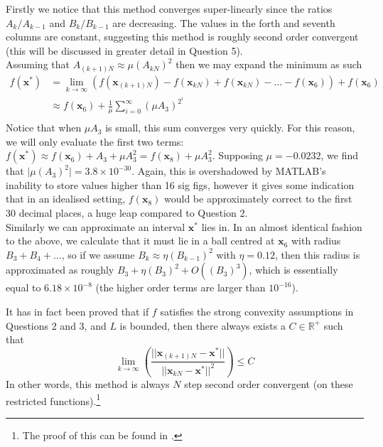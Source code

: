 \documentclass[10pt,a4paper,notitlepage]{article}
\newcommand{\abs}[1]{\lvert#1\rvert}
\newcommand{\R}{\mathbb{R}}
\newcommand{\x}{\mathbf{x}}
\begin{document}
Firstly we notice that this method converges super-linearly since the ratios $A_{k}/A_{k-1}$ and $B_{k}/B_{k-1}$ are decreasing. The values in the forth and seventh columns are constant, suggesting this method is roughly second order convergent (this will be discussed in greater detail in Question 5).\\

Assuming that $A_{(k+1)N}\approx \mu (A_{kN})^{2}$ then we may expand the minimum as such
\begin{equation}
\begin{aligned}
f(\x^{*}) &= \lim_{k\rightarrow \infty}\left( f(\x_{(k+1)N})-f(\x_{kN})+f(\x_{kN})-\hdots -f(\x_{6})\right)+f(\x_{6})\\
&\approx f(\x_{6})+ \frac{1}{\mu}\sum_{i=0}^{\infty}(\mu A_{3})^{2^{i}}\\
\end{aligned}
\end{equation}
Notice that when $\mu A_{3}$ is small, this sum converges very quickly. For this reason, we will only evaluate the first two terms:
$f(\x^{*})\approx f(\x_{6})+A_{3}+\mu A_{3}^{2}=f(\x_{8})+\mu A_{3}^{2}$. Supposing $\mu = -0.0232$, we find that $\abs{\mu (A_{3})^{2}}= 3.8\times 10^{-30}$. Again, this is overshadowed by MATLAB's inability to store values higher than 16 sig figs, however it gives some indication that in an idealised setting, $f(\x_{8})$ would be approximately correct to the first 30 decimal places, a huge leap compared to Question 2.\\

Similarly we can approximate an interval $\x^{*}$ lies in. In an almost identical fashion to the above, we calculate that it must lie in a ball centred at $\x_{6}$ with radius $B_{3}+B_{4}+\hdots$, so if we assume $B_{k}\approx \eta \left(B_{k-1}\right)^{2}$ with $\eta=0.12$, then this radius is approximated as roughly $B_{3}+\eta \left(B_{3}\right)^{2}+O\left(\left(B_{3}\right)^{3}\right)$, which is essentially equal to $6.18\times 10^{-8}$ (the higher order terms are larger than $10^{-16}$). 

It has in fact been proved that if $f$ satisfies the strong convexity assumptions in Questions 2 and 3, and $L$ is bounded,  then there always exists a $C\in \R^{+}$ such that
\begin{equation}
\lim_{k\rightarrow\infty}\left( \frac{\abs{\abs{\x_{(k+1)N}-\x^{*}}}}{\abs{\abs{\x_{kN}-\x^{*}}}^{2}}\right)\leq C
\end{equation}
In other words, this method is always $N$ step second order convergent (on these restricted functions).\footnote{The proof of this can be found in \cite{10.2307/2156398}.}
\end{document}
